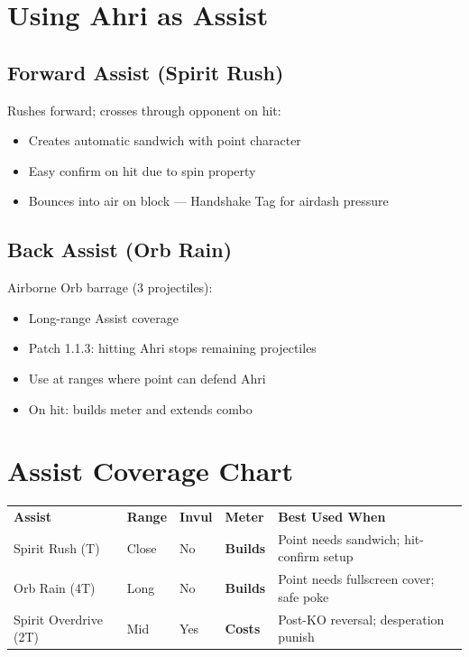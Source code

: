 \documentclass[12pt, a4paper]{report}
\newcommand{\advantage}[1]{\textcolor{ahriGreen}{\textbf{#1}}}
\newcommand{\disadvantage}[1]{\textcolor{ahriRed}{\textbf{#1}}}
\begin{document}
\section{Using Ahri as Assist}

\subsection{Forward Assist (Spirit Rush)}

Rushes forward; crosses through opponent on hit:
\begin{itemize}
  \item Creates automatic sandwich with point character
  \item Easy confirm on hit due to spin property
  \item Bounces into air on block --- Handshake Tag for airdash pressure
\end{itemize}

\subsection{Back Assist (Orb Rain)}

Airborne Orb barrage (3 projectiles):
\begin{itemize}
  \item Long-range Assist coverage
  \item Patch 1.1.3: hitting Ahri stops remaining projectiles
  \item Use at ranges where point can defend Ahri
  \item On hit: builds meter and extends combo
\end{itemize}

\section{Assist Coverage Chart}

\begin{center}
\begin{tabularx}{\linewidth}{L{2.5cm} C{2cm} C{2cm} C{2cm} L{4.5cm}}
\textcolor{ahriCyan}{\textbf{Assist}} &
\textcolor{ahriCyan}{\textbf{Range}} &
\textcolor{ahriCyan}{\textbf{Invul}} &
\textcolor{ahriCyan}{\textbf{Meter}} &
\textcolor{ahriCyan}{\textbf{Best Used When}} \\
Spirit Rush (T) & Close & No & \advantage{Builds} & Point needs sandwich; hit-confirm setup \\
Orb Rain (4T) & Long & No & \advantage{Builds} & Point needs fullscreen cover; safe poke \\
Spirit Overdrive (2T) & Mid & Yes & \disadvantage{Costs} & Post-KO reversal; desperation punish \\
\end{tabularx}
\end{center}
\end{document}
